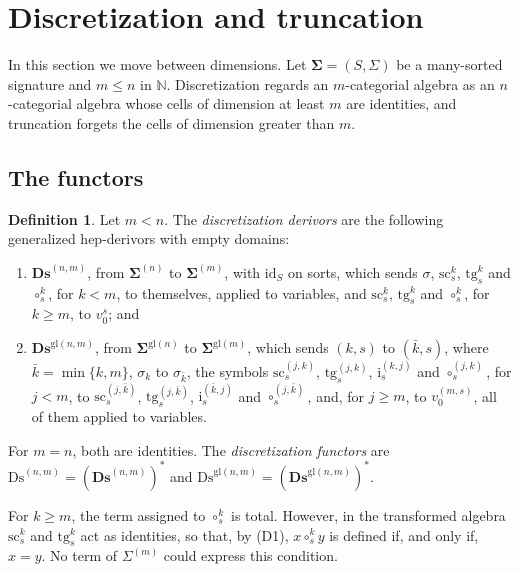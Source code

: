 \documentclass[a4paper,reqno]{amsart}
\newcommand{\sig}[1]{\mathbf{#1}}                %
\newcommand{\id}{\mathrm{id}}
\newcommand{\gl}{\mathrm{gl}}
\newcommand{\src}{\mathrm{sc}}
\newcommand{\tgt}{\mathrm{tg}}
\newcommand{\ii}{\mathrm{i}}
\newcommand{\Ds}{\mathrm{Ds}}
\newcommand{\bDs}{\mathbf{Ds}}
\theoremstyle{plain}
\theoremstyle{definition}
\newtheorem{definition}[theorem]{Definition}
\begin{document}
\section{Discretization and truncation}\label{STruncation}

In this section we move between dimensions.
Let $\sig{\Sigma}=(S,\Sigma)$ be a many-sorted signature and $m\leq n$ in $\mathbb{N}$.
Discretization regards an $m$-categorial algebra as an $n$-categorial algebra whose cells of dimension at least $m$ are identities, and truncation forgets the cells of dimension greater than $m$.

\subsection{The functors}

\begin{definition}\label{DDiscDerivor}
Let $m<n$.
The \emph{discretization derivors} are the following generalized hep-derivors with empty domains:
\begin{enumerate}
\item $\bDs^{(n,m)}$, from $\sig{\Sigma}^{(n)}$ to $\sig{\Sigma}^{(m)}$, with $\id_{S}$ on sorts, which sends $\sigma$, $\src^{k}_{s}$, $\tgt^{k}_{s}$ and $\circ^{k}_{s}$, for $k<m$, to themselves, applied to variables, and $\src^{k}_{s}$, $\tgt^{k}_{s}$ and $\circ^{k}_{s}$, for $k\geq m$, to $v^{s}_{0}$; and
\item $\bDs^{\gl(n,m)}$, from $\sig{\Sigma}^{\gl(n)}$ to $\sig{\Sigma}^{\gl(m)}$, which sends $(k,s)$ to $(\bar{k},s)$, where $\bar{k}=\min\{k,m\}$, $\sigma_{k}$ to $\sigma_{\bar{k}}$, the symbols $\src^{(j,k)}_{s}$, $\tgt^{(j,k)}_{s}$, $\ii^{(k,j)}_{s}$ and $\circ^{(j,k)}_{s}$, for $j<m$, to $\src^{(j,\bar{k})}_{s}$, $\tgt^{(j,\bar{k})}_{s}$, $\ii^{(\bar{k},j)}_{s}$ and $\circ^{(j,\bar{k})}_{s}$, and, for $j\geq m$, to $v^{(m,s)}_{0}$, all of them applied to variables.
\end{enumerate}
For $m=n$, both are identities.
The \emph{discretization functors} are $\Ds^{(n,m)}=(\bDs^{(n,m)})^{\ast}$ and $\Ds^{\gl(n,m)}=(\bDs^{\gl(n,m)})^{\ast}$.
\end{definition}

For $k\geq m$, the term assigned to $\circ^{k}_{s}$ is total.
However, in the transformed algebra $\src^{k}_{s}$ and $\tgt^{k}_{s}$ act as identities, so that, by (D1), $x\circ^{k}_{s}y$ is defined if, and only if, $x=y$.
No term of $\Sigma^{(m)}$ could express this condition.
\end{document}

